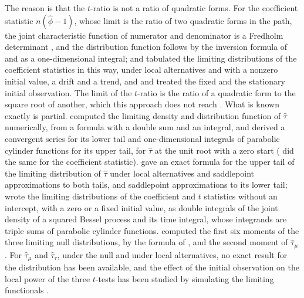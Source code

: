 \documentclass[ecta,nameyear,final]{econsocart}
\newcommand{\phih}{\hat\phi}
\theoremstyle{plain}
\theoremstyle{definition}
\begin{document}
The reason is that the $t$-ratio is not a ratio of quadratic forms.  For the coefficient statistic $n(\phih-1)$, whose limit is the ratio of two quadratic forms in the path, the joint characteristic function of numerator and denominator is a Fredholm determinant \citep{NabeyaTanaka1990}, and the distribution function follows by the inversion formula of \cite{Imhof1961} and \cite{GilPelaez1951} as a one-dimensional integral; \cite{NabeyaTanaka1990b} and \cite{NabeyaSorensen1994} tabulated the limiting distributions of the coefficient statistics in this way, under local alternatives and with a nonzero initial value, a drift and a trend, and \cite{Tanaka1990} and \cite{Perron1991b} treated the fixed and the stationary initial observation.  The limit of the $t$-ratio is the ratio of a quadratic form to the square root of another, which this approach does not reach \citep[Section~8.4]{Tanaka2017}.  What is known exactly is partial.  \cite{Abadir1992} computed the limiting density and distribution function of $\hat\tau$ numerically, from a formula with a double sum and an integral, and \cite{Abadir1995} derived a convergent series for its lower tail and one-dimensional integrals of parabolic cylinder functions for its upper tail, for $\hat\tau$ at the unit root with a zero start (\cite{Abadir1993a} did the same for the coefficient statistic).  \cite{Larsson1995} gave an exact formula for the upper tail of the limiting distribution of $\hat\tau$ under local alternatives and saddlepoint approximations to both tails, and \cite{Larsson1998} saddlepoint approximations to its lower tail; \cite{HitomiEtAl2022} wrote the limiting distributions of the coefficient and $t$ statistics without an intercept, with a zero or a fixed initial value, as double integrals of the joint density of a squared Bessel process and its time integral, whose integrands are triple sums of parabolic cylinder functions.  \cite{Nabeya1999} computed the first six moments of the three limiting null distributions, by the formula of \cite{Sawa1978}, and \cite{Larsson1997} the second moment of $\hat\tau_\mu$.  For $\hat\tau_\mu$ and $\hat\tau_\tau$, under the null and under local alternatives, no exact result for the distribution has been available, and the effect of the initial observation on the local power of the three $t$-tests has been studied by simulating the limiting functionals \citep{Elliott1999,MullerElliott2003,HarveyLeybourneTaylor2009}.
\end{document}
